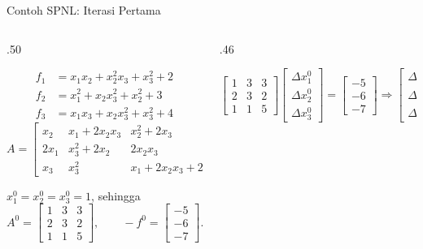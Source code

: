 \documentclass[aspectratio=169,10pt]{beamer}
\begin{document}
\begin{frame}{Contoh SPNL: Iterasi Pertama}
\tiny
\begin{columns}[T,totalwidth=\textwidth]
\begin{column}{.50\textwidth}
\begin{bluebox}
\[
\begin{aligned}
f_1&=x_1x_2+x_2^2x_3+x_3^2+2\\
f_2&=x_1^2+x_2x_3^2+x_2^2+3\\
f_3&=x_1x_3+x_2x_3^2+x_3^2+4
\end{aligned}
\]
\[
A=\begin{bmatrix}
x_2 & x_1+2x_2x_3 & x_2^2+2x_3\\
2x_1 & x_3^2+2x_2 & 2x_2x_3\\
x_3 & x_3^2 & x_1+2x_2x_3+2x_3
\end{bmatrix}
\]
\end{bluebox}
\begin{orangebox}
$x_1^0=x_2^0=x_3^0=1$, sehingga
\[
A^0=\begin{bmatrix}1&3&3\\2&3&2\\1&1&5\end{bmatrix},\qquad
-f^0=\begin{bmatrix}-5\\-6\\-7\end{bmatrix}.
\]
\end{orangebox}
\end{column}
\begin{column}{.46\textwidth}
\begin{greenbox}
\[
\begin{bmatrix}1&3&3\\2&3&2\\1&1&5\end{bmatrix}
\begin{bmatrix}\Delta x_1^0\\ \Delta x_2^0\\ \Delta x_3^0\end{bmatrix}
=\begin{bmatrix}-5\\-6\\-7\end{bmatrix}
\Rightarrow
\begin{bmatrix}\Delta x_1^0\\ \Delta x_2^0\\ \Delta x_3^0\end{bmatrix}
\]
\end{greenbox}
\end{column}
\end{columns}
\end{frame}
\end{document}
